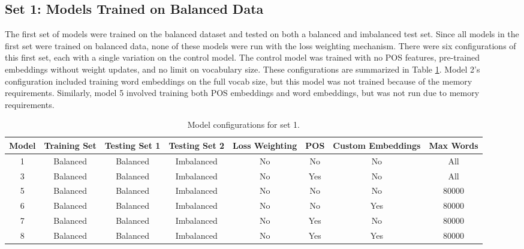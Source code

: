 \subsection{Set 1: Models Trained on Balanced Data}
The first set of models were trained on the balanced dataset and tested on both a balanced and imbalanced test set. Since all models in the first set were trained on balanced data, none of these models were run with the loss weighting mechanism. There were six configurations of this first set, each with a single variation on the control model. The control model was trained with no POS features, pre-trained embeddings without weight updates, and no limit on vocabulary size. These configurations are summarized in Table \ref{tab:set1_exp}. Model 2's configuration included training word embeddings on the full vocab size, but this model was not trained because of the memory requirements. Similarly, model 5 involved training both POS embeddings and word embeddings, but was not run due to memory requirements.
\begin{table}[ht]
	\centering
	\begin{tabular}{|c|c|c|c|c|c|c|c|}
		\hline
		Model & Training Set & Testing Set 1 & Testing Set 2 & Loss Weighting  & POS & Custom Embeddings & Max Words \\
		\hline
		1 & Balanced & Balanced & Imbalanced & No & No & No & All \\
		3 & Balanced & Balanced & Imbalanced & No & Yes & No & All \\
		5 & Balanced & Balanced & Imbalanced & No & No & No & 80000  \\
		6 & Balanced & Balanced & Imbalanced & No & No & Yes & 80000 \\
		7 & Balanced & Balanced & Imbalanced & No & Yes & No & 80000 \\
		8 & Balanced & Balanced & Imbalanced & No & Yes & Yes & 80000 \\
		\hline
	\end{tabular}
	\caption{\label{tab:set1_exp}Model configurations for set 1.}
\end{table}

